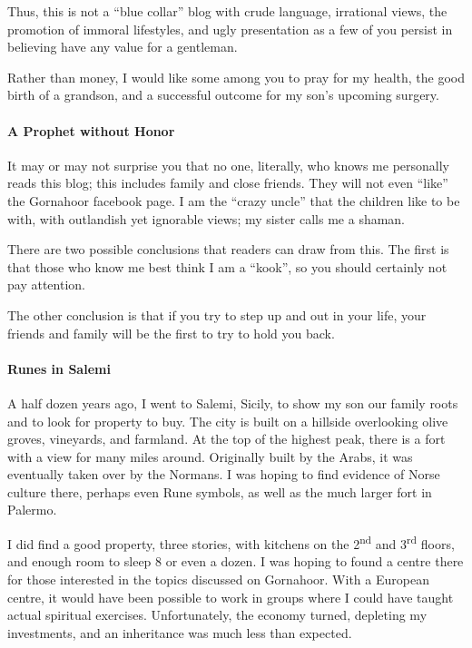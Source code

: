 Thus, this is not a ``blue collar'' blog with crude language, irrational views, the promotion of immoral lifestyles, and ugly presentation as a few of you persist in believing have any value for a gentleman.

Rather than money, I would like some among you to pray for my health, the good birth of a grandson, and a successful outcome for my son's upcoming surgery.

\paragraph{A Prophet without Honor}


It may or may not surprise you that no one, literally, who knows me personally reads this blog; this includes family and close friends. They will not even ``like'' the Gornahoor facebook page. I am the ``crazy uncle'' that the children like to be with, with outlandish yet ignorable views; my sister calls me a shaman.

There are two possible conclusions that readers can draw from this. The first is that those who know me best think I am a ``kook'', so you should certainly not pay attention.

The other conclusion is that if you try to step up and out in your life, your friends and family will be the first to try to hold you back.

\paragraph{Runes in Salemi}


A half dozen years ago, I went to Salemi, Sicily, to show my son our family roots and to look for property to buy. The city is built on a hillside overlooking olive groves, vineyards, and farmland. At the top of the highest peak, there is a fort with a view for many miles around. Originally built by the Arabs, it was eventually taken over by the Normans. I was hoping to find evidence of Norse culture there, perhaps even Rune symbols, as well as the much larger fort in Palermo.

I did find a good property, three stories, with kitchens on the 2\textsuperscript{nd} and 3\textsuperscript{rd} floors, and enough room to sleep 8 or even a dozen. I was hoping to found a centre there for those interested in the topics discussed on Gornahoor. With a European centre, it would have been possible to work in groups where I could have taught actual spiritual exercises. Unfortunately, the economy turned, depleting my investments, and an inheritance was much less than expected.

